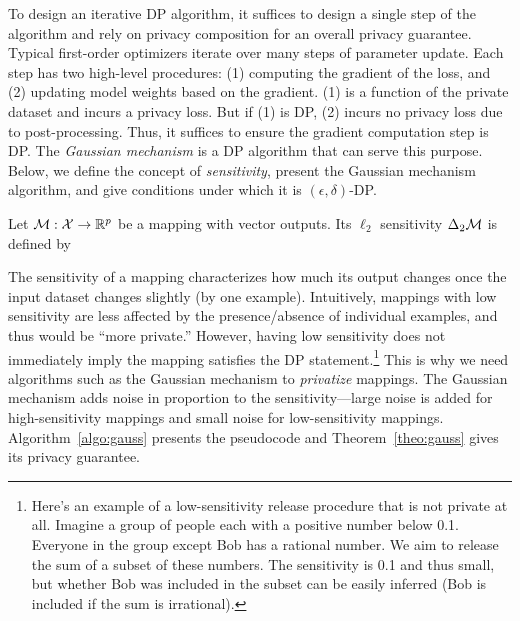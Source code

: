 To design an iterative DP algorithm, it suffices to design a single step of the algorithm and rely on privacy composition for an overall privacy guarantee.
Typical first-order optimizers iterate over many steps of parameter update.
Each step has two high-level procedures: (1) computing the gradient of the loss, and (2) updating model weights based on the gradient.
(1) is a function of the private dataset and incurs a privacy loss.
But if (1) is DP, (2) incurs no privacy loss due to post-processing.
Thus, it suffices to ensure the gradient computation step is DP.
The \emph{Gaussian mechanism} is a DP algorithm that can serve this purpose.
Below, we define the concept of \emph{sensitivity}, present the Gaussian mechanism algorithm, and give conditions under which it is $(\epsilon, \delta)$-DP.
\begin{defi}
Let $\mathcal{M}: \mathcal{X} \to \mathbb{R}^p$ be a mapping with vector outputs.
Its $\ell_2$ sensitivity $\Delta_2 \mathcal{M}$ is defined by
\end{defi}
The sensitivity of a mapping characterizes how much its output changes once the input dataset changes slightly (by one example).
Intuitively, mappings with low sensitivity are less affected by the presence/absence of individual examples, and thus would be ``more private.''
However, having low sensitivity does not immediately imply the mapping satisfies the DP statement.\footnote{Here's an example of a low-sensitivity release procedure that is not private at all. Imagine a group of people each with a positive number below 0.1. Everyone in the group except Bob has a rational number. We aim to release the sum of a subset of these numbers. The sensitivity is 0.1 and thus small, but whether Bob was included in the subset can be easily inferred (Bob is included if the sum is irrational).}
This is why we need algorithms such as the Gaussian mechanism to \emph{privatize} mappings.
The Gaussian mechanism adds noise in proportion to the sensitivity---large noise is added for high-sensitivity mappings and small noise for low-sensitivity mappings.
Algorithm~\ref{algo:gauss} presents the pseudocode and Theorem~\ref{theo:gauss} gives its privacy guarantee.

